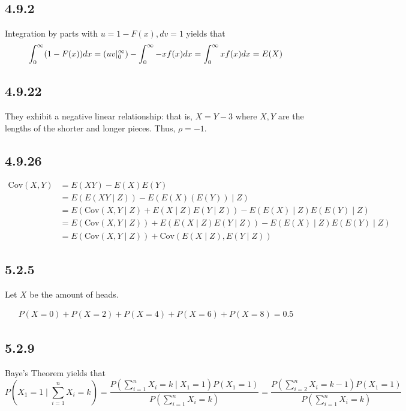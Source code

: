\documentclass[12pt,letterpaper]{article}
\theoremstyle{definition}
\newcommand{\cov}[1]{\text{Cov}\left(#1\right)}
\begin{document}
\subsection*{4.9.2}

Integration by parts with $u = 1 - F(x), dv = 1$ yields that
\[
  \int_0^\infty(1 - F(x))dx = \left( uv \Large|^\infty_0 \right) -
  \int_0^\infty-xf(x)dx = \int_0^\infty xf(x)dx = E(X)
\]

\subsection*{4.9.22}

They exhibit a negative linear relationship: that is, $X = Y - 3$ where $X, Y$
are the lengths of the shorter and longer pieces. Thus, $\rho = -1$.

\subsection*{4.9.26}

\begin{align*}
  \cov{X, Y} &= E(XY) - E(X)E(Y)\\
             &= E(E(XY \mid Z)) - E(E(X)(E(Y)) \mid Z) \\
             &= E(\cov{X, Y \mid Z} + E(X \mid Z)E(Y \mid Z)) - E(E(X) \mid Z)E(E(Y) \mid Z) \\
             &= E(\cov{X, Y \mid Z}) + E(E(X \mid Z)E(Y \mid Z)) - E(E(X) \mid Z)E(E(Y) \mid Z) \\
             &= E(\cov{X, Y \mid Z})  + \cov{E(X \mid Z), E(Y \mid Z)}
\end{align*}

\subsection*{5.2.5}

Let $X$ be the amount of heads.

\begin{align*}
  P(X = 0) + P(X = 2) + P(X = 4) + P(X = 6) + P(X = 8) = 0.5
\end{align*}

\subsection*{5.2.9}

Baye's Theorem yields that
\[
  P(X_1 = 1 \mid\sum_{i=1}^nX_i =  k) = \frac{P(\sum_{i=1}^nX_i = k \mid X_1 =
    1)P(X_1 = 1)}{P(\sum_{i=1}^nX_i = k)} = \frac{P(\sum_{i=2}^nX_i = k - 1)P(X_1 = 1)}{P(\sum_{i=1}^nX_i = k)} 
\]
\end{document}
